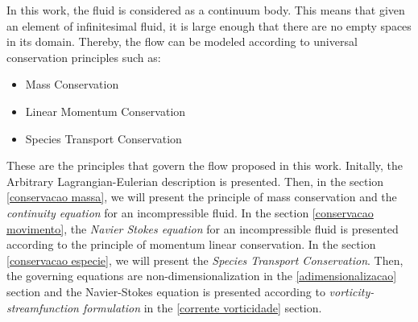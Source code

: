In this work, the fluid is considered as a continuum body. 
This means that given an element of infinitesimal fluid,
 it is large enough that there are no empty spaces
 in its domain. Thereby, the flow can be modeled
 according to universal conservation principles such as:

\begin{itemize}
 \item Mass Conservation
 \item Linear Momentum Conservation
 \item Species Transport Conservation
\end{itemize}

These are the principles that govern the flow proposed in this work.
 Initally, the Arbitrary Lagrangian-Eulerian description is presented.
 Then, in the section \ref{conservacao massa}, we will present the principle
 of mass conservation and the \textit{continuity equation} for
 an incompressible fluid. In the section
 \ref{conservacao movimento}, the
 \textit{Navier Stokes equation} for an incompressible fluid
 is presented according to the principle of momentum linear 
 conservation. In the section \ref{conservacao especie},
 we will present the \textit{Species Transport Conservation}.
 Then, the governing equations are non-dimensionalization
 in the \ref{adimensionalizacao} section and
 the Navier-Stokes equation is presented according to
 \textit{vorticity-streamfunction formulation} in the
 \ref{corrente vorticidade} section.
